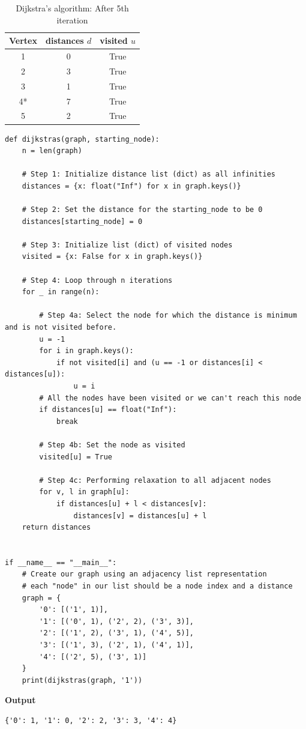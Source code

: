 \documentclass[a4paper,11pt]{book}
\begin{document}
\begin{table}[H]
\centering
\begin{tabular}{|c|c|c|}
\hline
\multicolumn{1}{|l|}{\textbf{Vertex}} & \textbf{distances  $d$} & \textbf{visited $u$} \\ \hline
1   & 0             & True     \\ 
2   & 3      & True     \\ 
3   & 1      & True     \\ 
4*   & 7      & True     \\ 
5   & 2      & True     \\ \hline
\end{tabular}
\caption{Dijkstra's algorithm: After 5th iteration}
\end{table}

\begin{lstlisting}
def dijkstras(graph, starting_node):
    n = len(graph)
    
    # Step 1: Initialize distance list (dict) as all infinities
    distances = {x: float("Inf") for x in graph.keys()}
    
    # Step 2: Set the distance for the starting_node to be 0
    distances[starting_node] = 0
    
    # Step 3: Initialize list (dict) of visited nodes
    visited = {x: False for x in graph.keys()}
    
    # Step 4: Loop through n iterations
    for _ in range(n):
        
        # Step 4a: Select the node for which the distance is minimum and is not visited before.
        u = -1
        for i in graph.keys():
            if not visited[i] and (u == -1 or distances[i] < distances[u]):
                u = i
        # All the nodes have been visited or we can't reach this node
        if distances[u] == float("Inf"):
            break
        
        # Step 4b: Set the node as visited
        visited[u] = True
        
        # Step 4c: Performing relaxation to all adjacent nodes
        for v, l in graph[u]:
            if distances[u] + l < distances[v]:
                distances[v] = distances[u] + l
    return distances


if __name__ == "__main__":
    # Create our graph using an adjacency list representation
    # each "node" in our list should be a node index and a distance
    graph = {
        '0': [('1', 1)],
        '1': [('0', 1), ('2', 2), ('3', 3)],
        '2': [('1', 2), ('3', 1), ('4', 5)],
        '3': [('1', 3), ('2', 1), ('4', 1)],
        '4': [('2', 5), ('3', 1)]
    }
    print(dijkstras(graph, '1'))
\end{lstlisting}
\textbf{Output}
\begin{lstlisting}
{'0': 1, '1': 0, '2': 2, '3': 3, '4': 4}
\end{lstlisting}
\end{document}

